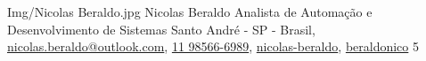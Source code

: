 \begin{Header}
	{Img/Nicolas Beraldo.jpg} %
	{Nicolas Beraldo} %
	{Analista de Automação e Desenvolvimento de Sistemas} %
	{ %
		 Santo André - SP - Brasil,
		 \href{mailto:nicolas.beraldo@outlook.com}{nicolas.beraldo@outlook.com},
		 \href{tel:11 98566-6989}{11 98566-6989},
		 \href{https://www.linkedin.com/in/nicolas-beraldo}{nicolas-beraldo},
		 \href{https://github.com/beraldonico}{beraldonico}
	}{5} %
\end{Header}